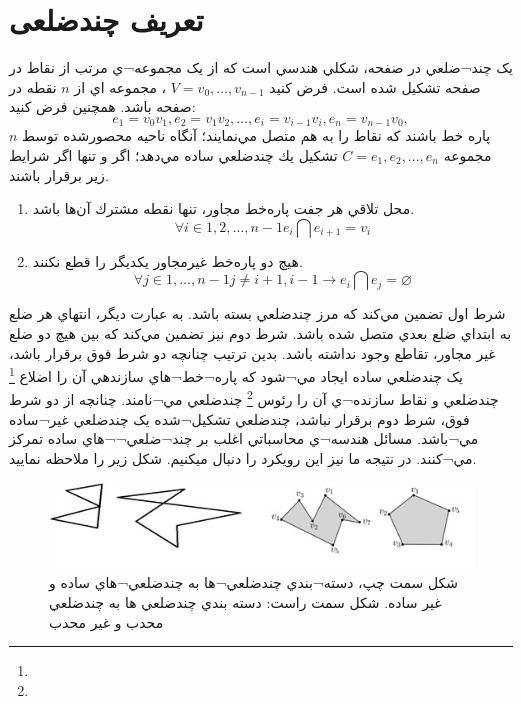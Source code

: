 \documentclass{book}
\begin{document}
	 	  \section*{تعریف چندضلعی}
	 	   يک چند¬ضلعي در صفحه، شکلي هندسي است که از يک مجموعه¬ي مرتب از نقاط در صفحه تشکيل شده است. فرض كنيد 
	 	   $V={v_{0}, \dots, v_{n-1}}$
	 	   ، مجموعه اي از $n$ نقطه در صفحه باشد. همچنين فرض كنيد:
	 	   $$e_{1}=v_{0}v_{1}, e_{2}=v_{1}v_{2}, \dots , e_{i}=v_{i-1}v_{i}, e_{n}=v_{n-1}v_{0},$$
	 	   $n$
	 	   پاره خط باشند كه نقاط را به هم متصل مي‌نمايند؛ آنگاه ناحيه محصورشده توسط مجموعه 
	 	   $C= {e_{1},e_{2},... ,e_{n} }$
	 	    تشكيل يك چندضلعي ساده مي‌دهد؛ اگر و تنها اگر شرايط زير برقرار باشند.
	 	    \begin{enumerate}
	 	    	\item 
	 	    	محل تلاقي هر جفت پاره‌خط مجاور، تنها نقطه مشترك آن‌ها باشد.
	 	    	$$\forall i \in {1,2,\dots ,n-1}  		e_{i} \bigcap e_{i+1} = v_{i} $$
	 	    	\item 
	 	    	هيچ دو پاره‌خط غيرمجاور يكديگر را قطع نكنند.
	 	    	$$\forall j \in {1,\dots ,n-1} j\neq i+1 , i-1 \rightarrow   e_{i} \bigcap e_{j} = \varnothing $$
	 	    \end{enumerate}
 	    شرط اول تضمين مي‌کند که مرز چندضلعي بسته باشد. به عبارت ديگر، انتهاي هر ضلع به ابتداي ضلع بعدي متصل شده باشد. شرط دوم نيز تضمين مي‌کند که بين هيچ دو ضلع غير مجاور، تقاطع وجود نداشته باشد. بدين ترتيب چنانچه دو شرط فوق برقرار باشد، يک چندضلعي ساده ايجاد مي¬شود که پاره¬خط¬هاي سازنده‍ي آن را اضلاع 
 	    \footnote{}
 	     چندضلعي و نقاط سازنده¬ي آن را رئوس 
 	      	    \footnote{}
 	      چندضلعي مي¬نامند. چنانچه از دو شرط فوق، شرط دوم برقرار نباشد، چندضلعي تشکيل¬شده يک چندضلعي غير¬ساده مي¬باشد. مسائل هندسه¬ي محاسباتي اغلب بر چند¬ضلعي¬¬هاي ساده تمرکز مي¬کنند. در نتيجه ما نيز اين رويکرد را دنبال مي‍کنيم. شکل زير را ملاحظه نماييد.
 	      	 	\begin{figure}[h]
 	      	\begin{center}
 	      		\includegraphics{6.jpg}
 	      		\caption{شکل سمت چپ، دسته¬بندي چندضلعي¬ها به چندضلعي¬هاي ساده و غير ساده. شکل سمت راست:  دسته بندي چندضلعي ها به چندضلعي محدب و غير محدب }
 	      	\end{center}
       	   	\label{شکل 6}
 	      \end{figure}
\end{document}

